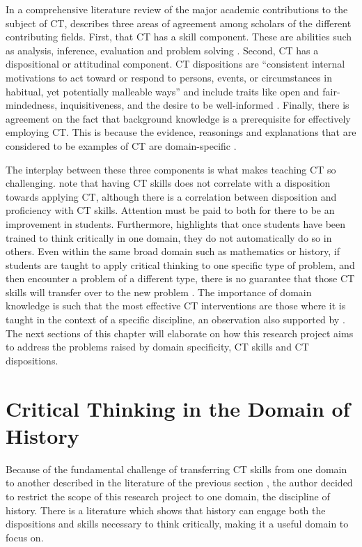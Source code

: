 \documentclass{l4proj}
\begin{document}
In a comprehensive literature review of the major academic contributions to the subject of CT, \citet{lai2011critical} describes three areas of agreement among scholars of the different contributing fields. First, that CT has a skill component. These are abilities such as analysis, inference, evaluation and problem solving \citep{lai2011critical}. Second, CT has a dispositional or attitudinal component. CT dispositions are “consistent internal motivations to act toward or respond to persons, events, or circumstances in habitual, yet potentially malleable ways” \citep{facione2000CT} and include traits like open and fair-mindedness, inquisitiveness, and the desire to be well-informed \citep{lai2011critical}. Finally, there is agreement on the fact that background knowledge is a prerequisite for effectively employing CT. This is because the evidence, reasonings and explanations that are considered to be examples of CT are domain-specific \citep{lai2011critical}. 

The interplay between these three components is what makes teaching CT so challenging. \citet{facione2000CT} note that having CT skills does not correlate with a disposition towards applying CT, although there is a correlation between disposition and proficiency with CT skills. Attention must be paid to both for there to be an improvement in students. Furthermore, \citet{willingham2008critical} highlights that once students have been trained to think critically in one domain, they do not automatically do so in others. Even within the same broad domain such as mathematics or history, if students are taught to apply critical thinking to one specific type of problem, and then encounter a problem of a different type, there is no guarantee that those CT skills will transfer over to the new problem \citep{willingham2008critical}. The importance of domain knowledge is such that the most effective CT interventions are those where it is taught in the context of a specific discipline, an observation also supported by \citet{lai2011critical}. The next sections of this chapter will elaborate on how this research project aims to address the problems raised by domain specificity, CT skills and CT dispositions. 

\section{Critical Thinking in the Domain of History}

Because of the fundamental challenge of transferring CT skills from one domain to another described in the literature of the previous section \citep{lai2011critical, willingham2008critical}, the author decided to restrict the scope of this research project to one domain, the discipline of history. There is a literature which shows that history can engage both the dispositions and skills necessary to think critically, making it a useful domain to focus on.
\end{document}

